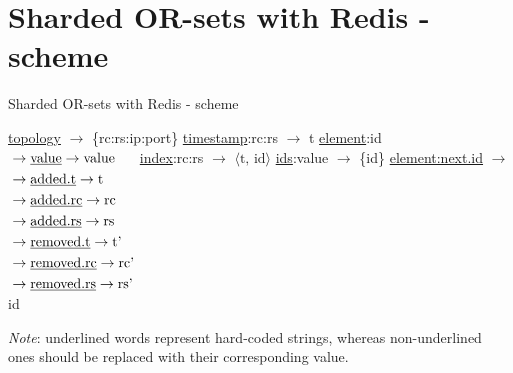 \clearpage

\section{Sharded OR-sets with Redis - scheme}

\begin{algorithm}
  \small
  \caption{Sharded OR-sets with Redis - scheme}
  \begin{algorithmic}[0]
    \State \underline{topology} $\rightarrow$ \{rc:rs:ip:port\}  
    \State \underline{timestamp}:rc:rs $\rightarrow$ t  
    \State \underline{element}:id $\begin{aligned}[t]
                                    & \rightarrow \text{\underline{value}} \rightarrow \text{value} \\
                                    & \rightarrow \text{\underline{added.t}} \rightarrow \text{t} \\
                                    & \rightarrow \text{\underline{added.rc}} \rightarrow \text{rc} \\
                                    & \rightarrow \text{\underline{added.rs}} \rightarrow \text{rs} \\
                                    & \rightarrow \text{\underline{removed.t}} \rightarrow \text{t'} \\
                                    & \rightarrow \text{\underline{removed.rc}} \rightarrow \text{rc'} \\
                                    & \rightarrow \text{\underline{removed.rs}} \rightarrow \text{rs'}
                                  \end{aligned}$ 
    \State \underline{index}:rc:rs $\rightarrow$ $\langle \text{t, id} \rangle$ 
    \State \underline{ids}:value $\rightarrow$ \{id\} 
    \State \underline{element:next.id} $\rightarrow$ id 
  \end{algorithmic}
\end{algorithm}

\textit{Note}: underlined words represent hard-coded strings, whereas
non-underlined ones should be replaced with their corresponding value. 


